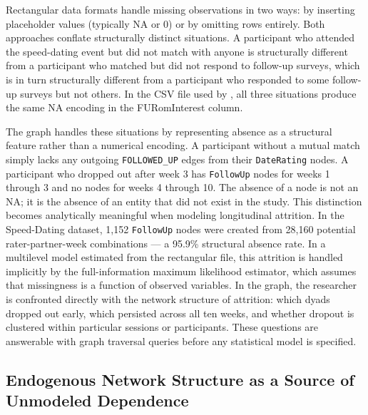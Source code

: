 \documentclass[sn-apa,pdflatex]{sn-jnl}
\theoremstyle{remark}
\theoremstyle{definition}
\begin{document}
Rectangular data formats handle missing observations in two ways: by
inserting placeholder values (typically NA or 0) or by omitting rows
entirely. Both approaches conflate structurally distinct situations. A
participant who attended the speed-dating event but did not match with
anyone is structurally different from a participant who matched but did
not respond to follow-up surveys, which is in turn structurally
different from a participant who responded to some follow-up surveys but
not others. In the CSV file used by \citet{Selterman2023}, all three
situations produce the same NA encoding in the FURomInterest column.

The graph handles these situations by representing absence as a
structural feature rather than a numerical encoding. A participant
without a mutual match simply lacks any outgoing \texttt{FOLLOWED\_UP}
edges from their \texttt{DateRating} nodes. A participant who dropped
out after week 3 has \texttt{FollowUp} nodes for weeks 1 through 3 and
no nodes for weeks 4 through 10. The absence of a node is not an NA; it
is the absence of an entity that did not exist in the study. This
distinction becomes analytically meaningful when modeling longitudinal
attrition. In the Speed-Dating dataset, 1,152 \texttt{FollowUp} nodes
were created from 28,160 potential rater-partner-week combinations --- a
95.9\% structural absence rate. In a multilevel model estimated from the
rectangular file, this attrition is handled implicitly by the
full-information maximum likelihood estimator, which assumes that
missingness is a function of observed variables. In the graph, the
researcher is confronted directly with the network structure of
attrition: which dyads dropped out early, which persisted across all ten
weeks, and whether dropout is clustered within particular sessions or
participants. These questions are answerable with graph traversal
queries before any statistical model is specified.

\subsection{Endogenous Network Structure as a Source of Unmodeled
Dependence}\label{endogenous-network-structure-as-a-source-of-unmodeled-dependence}
\end{document}
